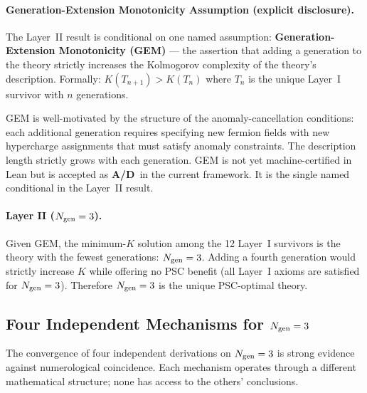 \documentclass[11pt,openany]{book}
\theoremstyle{remark}
\newcommand{\Ngen}{N_{\rm gen}}
\newcommand{\CatAD}{\textbf{A/D}}
\begin{document}
\paragraph{Generation-Extension Monotonicity Assumption (explicit disclosure).}
The Layer~II result is conditional on one named assumption: \textbf{Generation-Extension
Monotonicity (GEM)} --- the assertion that adding a generation to the theory strictly
increases the Kolmogorov complexity of the theory's description. Formally: $K(T_{n+1})
> K(T_n)$ where $T_n$ is the unique Layer~I survivor with $n$ generations.

GEM is well-motivated by the structure of the anomaly-cancellation conditions: each
additional generation requires specifying new fermion fields with new hypercharge
assignments that must satisfy anomaly constraints. The description length strictly
grows with each generation. GEM is not yet machine-certified in Lean but is accepted as
\CatAD\ in the current framework. It is the single named conditional in the Layer~II
result.

\paragraph{Layer II ($\Ngen = 3$).}
Given GEM, the minimum-$K$ solution among the 12 Layer~I survivors is the theory with
the fewest generations: $\Ngen = 3$. Adding a fourth generation would strictly increase
$K$ while offering no PSC benefit (all Layer~I axioms are satisfied for $\Ngen = 3$).
Therefore $\Ngen = 3$ is the unique PSC-optimal theory.

\subsection*{Four Independent Mechanisms for $\Ngen = 3$}

The convergence of four independent derivations on $\Ngen = 3$ is strong evidence
against numerological coincidence. Each mechanism operates through a different
mathematical structure; none has access to the others' conclusions.
\end{document}
